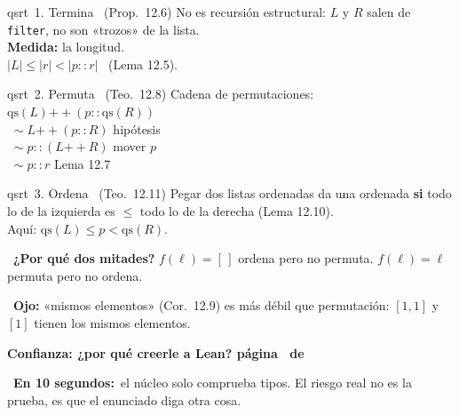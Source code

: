 \documentclass[12pt]{article}
\newcommand{\qs}{\mathrm{qs}}
\newcommand{\concat}{\mathbin{+\!\!+}}
\newcommand{\encabezado}[4]{%
  \begin{tcolorbox}[colback=#1, colframe=#1, arc=5pt, boxrule=0pt,
      left=10pt, right=10pt, top=5pt, bottom=5pt, after skip=4pt]
    \color{white}\LARGE #2\quad\bfseries #3\hfill
    \normalfont\large página \thepage\ de \pageref{LastPage}
  \end{tcolorbox}
  \begin{tcolorbox}[colback=tldr, colframe=#1, boxrule=0.8pt, arc=4pt,
      left=10pt, right=10pt, top=4pt, bottom=4pt, after skip=8pt]
    \large\faBolt\ \textbf{En 10 segundos:}\ #4
  \end{tcolorbox}}
\begin{document}
\vspace{2pt}
\begin{tcbraster}[raster columns=3, raster column skip=8pt, raster equal height, raster every box/.style={before upper=\large}]
\begin{tarjeta}{qsrt}{\faClock\ 1. Termina \ (Prop.\ 12.6)}
No es recursión estructural: $L$ y $R$ salen de \texttt{filter}, no son
«trozos» de la lista.\\[4pt]
\textbf{Medida:} la longitud.\\
$|L|\le|r|<|p::r|$ \ (Lema 12.5).
\end{tarjeta}
\begin{tarjeta}{qsrt}{\faExchange*\ 2. Permuta \ (Teo.\ 12.8)}
Cadena de permutaciones:\\[2pt]
$\qs(L)\concat(p::\qs(R))$\\
$\;\sim L\concat(p::R)$ \hfill{\small hipótesis}\\
$\;\sim p::(L\concat R)$ \hfill{\small mover $p$}\\
$\;\sim p::r$ \hfill{\small Lema 12.7}
\end{tarjeta}
\begin{tarjeta}{qsrt}{\faSortAmountUp\ 3. Ordena \ (Teo.\ 12.11)}
Pegar dos listas ordenadas da una ordenada \textbf{si} todo lo de la
izquierda es $\le$ todo lo de la derecha (Lema 12.10).\\[4pt]
Aquí: $\qs(L)\le p<\qs(R)$.
\end{tarjeta}
\end{tcbraster}

\vfill
\begin{tcbraster}[raster columns=2, raster column skip=8pt, raster equal height]
\begin{tcolorbox}[colback=ambar!12, colframe=ambar, arc=4pt, boxrule=1pt]
\faQuestionCircle\ \textbf{¿Por qué dos mitades?} $f(\ell)=[\,]$ ordena pero no
permuta. $f(\ell)=\ell$ permuta pero no ordena.
\end{tcolorbox}
\begin{tcolorbox}[colback=ambar!12, colframe=ambar, arc=4pt, boxrule=1pt]
\faExclamationTriangle\ \textbf{Ojo:} «mismos elementos» (Cor.\ 12.9) es más
débil que permutación: $[1,1]$ y $[1]$ tienen los mismos elementos.
\end{tcolorbox}
\end{tcbraster}

\newpage
\encabezado{conf}{\faShield*}{Confianza: ¿por qué creerle a Lean?}{el núcleo
solo comprueba tipos. El riesgo real no es la prueba, es que el enunciado diga
otra cosa.}
\end{document}
